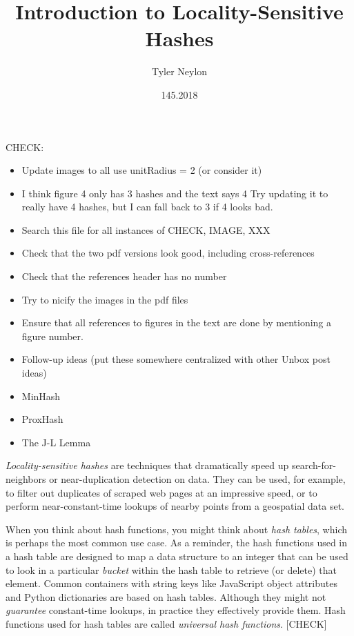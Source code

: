 \documentclass[20pt,]{extarticle}
\title{Introduction to Locality-Sensitive Hashes}
\author{Tyler Neylon}
\date{145.2018}
\providecommand{\tightlist}{%
  \setlength{\itemsep}{0pt}\setlength{\parskip}{0pt}}
\newcommand{\class}[1]{}
\newcommand{\optquad}{\quad}
\newcommand{\smallscrneg}{}
\newcommand{\smallscr}[1]{}
\newcommand{\bigscr}[1]{#1}
\newcommand{\smallscrskip}[1]{}
\begin{document}
\maketitle

CHECK:

\begin{itemize}
\tightlist
\item
  Update images to all use unitRadius = 2 (or consider it)
\item
  I think figure 4 only has 3 hashes and the text says 4 Try updating it
  to really have 4 hashes, but I can fall back to 3 if 4 looks bad.
\item
  Search this file for all instances of CHECK, IMAGE, XXX
\item
  Check that the two pdf versions look good, including cross-references
\item
  Check that the references header has no number
\item
  Try to nicify the images in the pdf files
\item
  Ensure that all references to figures in the text are done by
  mentioning a figure number.
\item
  Follow-up ideas (put these somewhere centralized with other Unbox post
  ideas)
\item
  MinHash
\item
  ProxHash
\item
  The J-L Lemma
\end{itemize}

\newcommand{\R}{\mathbb{R}}
\newcommand{\Z}{\mathbb{Z}}
\newcommand{\eqnset}[1]{\left.\mbox{$#1$}\;\;\right\rbrace\class{postbrace}{ }}
\providecommand{\optquad}{\class{optquad}{}}
\providecommand{\smallscrneg}{\class{smallscrneg}{ }}
\providecommand{\bigscr}[1]{\class{bigscr}{#1}}
\providecommand{\smallscr}[1]{\class{smallscr}{#1}}
\providecommand{\smallscrskip}[1]{\class{smallscrskip}{\hskip #1}}

\emph{Locality-sensitive hashes} are techniques that dramatically speed
up search-for-neighbors or near-duplication detection on data. They can
be used, for example, to filter out duplicates of scraped web pages at
an impressive speed, or to perform near-constant-time lookups of nearby
points from a geospatial data set.

When you think about hash functions, you might think about \emph{hash
tables}, which is perhaps the most common use case. As a reminder, the
hash functions used in a hash table are designed to map a data structure
to an integer that can be used to look in a particular \emph{bucket}
within the hash table to retrieve (or delete) that element. Common
containers with string keys like JavaScript object attributes and Python
dictionaries are based on hash tables. Although they might not
\emph{guarantee} constant-time lookups, in practice they effectively
provide them. Hash functions used for hash tables are called
\emph{universal hash functions}. {[}CHECK{]}
\end{document}
